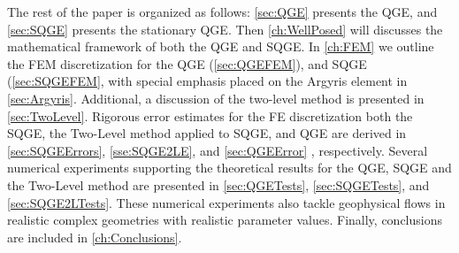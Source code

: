 The rest of the paper is organized as follows: \autoref{sec:QGE} presents the
QGE, and \autoref{sec:SQGE} presents the stationary QGE. Then
\autoref{ch:WellPosed} will discusses the mathematical framework of both the QGE
and SQGE.  In \autoref{ch:FEM} we outline the FEM discretization for the QGE
(\autoref{sec:QGEFEM}), and SQGE (\autoref{sec:SQGEFEM}, with special emphasis
placed on the Argyris element in \autoref{sec:Argyris}. Additional, a discussion
of the two-level method is presented in \autoref{sec:TwoLevel}. Rigorous error
estimates for the FE discretization both the SQGE, the Two-Level method applied
to SQGE, and QGE are derived in \autoref{sec:SQGEErrors}, \autoref{sse:SQGE2LE},
and \autoref{sec:QGEError} , respectively.  Several numerical experiments
supporting the theoretical results for the QGE, SQGE and the Two-Level method
are presented in \autoref{sec:QGETests}, \autoref{sec:SQGETests}, and
\autoref{sec:SQGE2LTests}. These numerical experiments also tackle geophysical
flows in realistic complex geometries with realistic parameter values. Finally,
conclusions are included in \autoref{ch:Conclusions}.

